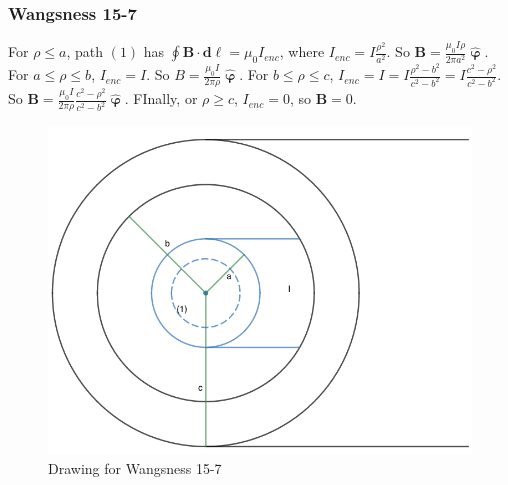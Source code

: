 \documentclass[crop=false,class=book,oneside]{standalone}
\begin{document}
            \subsubsection{Wangsness 15-7}
            For $\rho\leq a$, path $(1)$ has $\oint \mathbf{B}\cdot \mathbf{d\ell}= \mu_0 I_{enc}$, where $I_{enc} = I\frac{\rho^2}{a^2}$. So $\mathbf{B} = \frac{\mu_0 I\rho}{2\pi a^2} \hat{\boldsymbol{\upvarphi}}$. For $a\leq \rho \leq b$, $I_{enc} = I$. So $B = \frac{\mu_0 I}{2\pi \rho} \hat{\boldsymbol{\upvarphi}}$. For $b\leq \rho \leq c$, $I_{enc} = I =I\frac{\rho^2-b^2}{c^2-b^2} = I\frac{c^2-\rho^2}{c^2-b^2}$. So $\mathbf{B} = \frac{\mu_0 I}{2\pi \rho} \frac{c^2-\rho^2}{c^2-b^2}\hat{\boldsymbol{\upvarphi}}$. FInally, or $\rho \geq c$, $I_{enc} = 0$, so $\mathbf{B} = 0$.
            \begin{figure}[htbp]
                \centering
                \captionsetup{type=figure}
                \includegraphics[scale=0.4]{15-7.png}
                \caption{Drawing for Wangsness 15-7}
            \end{figure}
\end{document}
